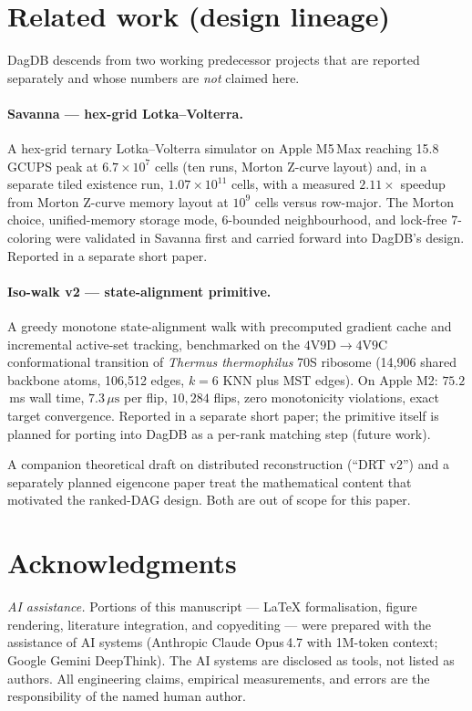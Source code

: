 \documentclass[11pt]{article}
\begin{document}
\section{Related work (design lineage)}
\label{sec:related}

DagDB descends from two working predecessor projects that are reported
separately and whose numbers are \emph{not} claimed here.

\paragraph{Savanna --- hex-grid Lotka--Volterra.}
A hex-grid ternary Lotka--Volterra simulator on Apple M5\,Max
reaching 15.8 GCUPS peak at $6.7\times 10^{7}$ cells (ten runs,
Morton Z-curve layout) and, in a separate tiled existence run,
$1.07\times 10^{11}$ cells, with a measured $2.11\times$ speedup from
Morton Z-curve memory layout at $10^{9}$ cells versus row-major. The
Morton choice, unified-memory storage mode, 6-bounded neighbourhood,
and lock-free 7-coloring were validated in Savanna first and carried
forward into DagDB's design. Reported in a separate short paper.

\paragraph{Iso-walk v2 --- state-alignment primitive.}
A greedy monotone state-alignment walk with precomputed gradient
cache and incremental active-set tracking, benchmarked on the
$4\text{V}9\text{D}\to 4\text{V}9\text{C}$ conformational transition
of \emph{Thermus thermophilus} 70S ribosome (14{,}906 shared backbone
atoms, 106{,}512 edges, $k\!=\!6$ KNN plus MST edges). On Apple M2:
$75.2$\,ms wall time, $7.3\,\mu\text{s}$ per flip, $10{,}284$ flips,
zero monotonicity violations, exact target convergence. Reported in
a separate short paper; the primitive itself is planned for porting
into DagDB as a per-rank matching step (future work).

A companion theoretical draft on distributed reconstruction (``DRT
v2'') and a separately planned eigencone paper
treat the mathematical content that motivated the ranked-DAG design.
Both are out of scope for this paper.

\section*{Acknowledgments}

\noindent\textit{AI assistance.} Portions of this manuscript ---
LaTeX formalisation, figure rendering, literature integration, and
copyediting --- were prepared with the assistance of AI systems
(Anthropic Claude Opus\,4.7 with 1M-token context; Google Gemini
DeepThink). The AI systems are disclosed as tools, not listed as
authors. All engineering claims, empirical measurements, and errors
are the responsibility of the named human author.
\end{document}
